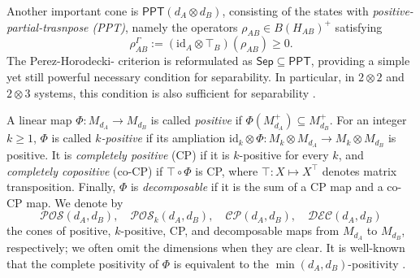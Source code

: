 \documentclass[11pt,reqno]{amsart}
\theoremstyle{definition}
\theoremstyle{definition}
\theoremstyle{definition}
\theoremstyle{definition}
\newcommand{\id}{\mathrm{id}}
\newcommand{\Sep}{\mathsf{Sep}}
\newcommand{\ppt}{\mathsf{PPT}}
\newcommand{\PO}{\mathcal{POS}}
\newcommand{\CP}{\mathcal{CP}}
\newcommand{\DEC}{\mathcal{DEC}}
\begin{document}
Another important cone is $\ppt(d_A\otimes d_B)$, consisting of the states with \textit{positive-partial-trasnpose (PPT)}, namely the operators $\rho_{AB}\in B(H_{AB})^+$ satisfying
    $$\rho_{AB}^{\Gamma}:=(\id_A\otimes \top_B)(\rho_{AB})\geq 0.$$
The Perez-Horodecki- criterion \cite{Per96,HHH96} is reformulated as $\Sep\subseteq \ppt$, providing a simple yet still powerful necessary condition for separability. In particular, in $2\otimes2$ and $2\otimes3$ systems, this condition is also sufficient for separability \cite{stormer1963positive,Wor76}.

\medskip

A linear map $\Phi:M_{d_A}\to M_{d_B}$ is called \emph{positive} if $\Phi(M_{d_A}^+)\subseteq M_{d_B}^+$. For an integer $k\geq 1$, $\Phi$ is called \emph{$k$-positive} if its ampliation $\id_k\otimes \Phi:M_k\otimes M_{d_A}\to M_k\otimes M_{d_B}$ is positive. It is \emph{completely positive} (CP) if it is $k$-positive for every $k$, and \emph{completely copositive} (co-CP) if $\top\circ\Phi$ is CP, where $\top:X\mapsto X^{\top}$ denotes matrix transposition. Finally, $\Phi$ is \emph{decomposable} if it is the sum of a CP map and a co-CP map. We denote by
    $$\PO(d_A,d_B), \quad \PO_k(d_A,d_B), \quad \CP(d_A,d_B), \quad \DEC(d_A,d_B) $$
the cones of positive, $k$-positive, CP, and decomposable maps from $M_{d_A}$ to $M_{d_B}$, respectively; we often omit the dimensions when they are clear. It is well-known that the complete positivity of $\Phi$ is equivalent to the $\min(d_A,d_B)$-positivity \cite{Cho75a}. 
\end{document}
